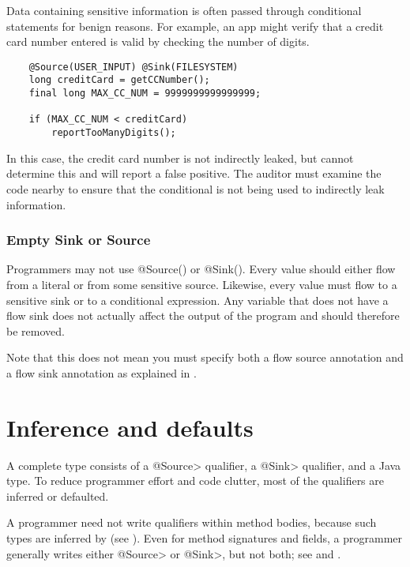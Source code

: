 Data containing sensitive information is often passed through conditional statements for benign reasons.  
For example, an app might verify that a credit card number entered is valid by checking the number of digits.

\begin{Verbatim}
    @Source(USER_INPUT) @Sink(FILESYSTEM)
    long creditCard = getCCNumber();
    final long MAX_CC_NUM = 9999999999999999;

    if (MAX_CC_NUM < creditCard)
        reportTooManyDigits();
\end{Verbatim}

In this case, the credit card number is not indirectly leaked, but \theFlowChecker  
cannot determine this and will report a false positive.
The auditor must examine the code nearby
to ensure that the conditional is not being used to indirectly leak information.


\subsubsection{Empty Sink or Source\label{sec:emptyflow}}

Programmers may not use @Source(\ttcbs) or @Sink(\ttcbs).
Every value should either flow from a literal or from some sensitive
source.  Likewise, every value must flow to a sensitive sink or to a
conditional expression.  Any variable that does not have
 a flow sink does not actually affect the output of the program and
should therefore be removed.
  
Note that this does not mean you must specify both a flow source
annotation and a flow sink annotation as explained in
. 

  \section{Inference and defaults}
 \label{sec:system:defaults}
 
 A complete type consists of a \<@Source> qualifier, a \<@Sink> qualifier,
 and a Java type.  To reduce programmer effort and code clutter, most of the
 qualifiers are inferred or defaulted.  
 
 A programmer need not write qualifiers within method bodies,
 because such types are inferred by \theFlowChecker (see ).
 Even for method signatures and
 fields, a programmer generally writes either \<@Source> or
 \<@Sink>, but not both; see  and 
.

